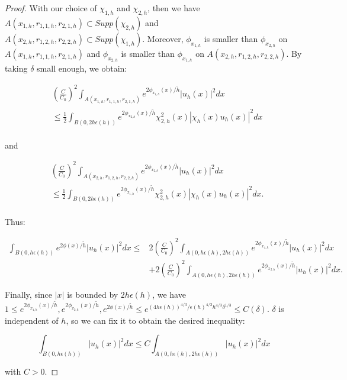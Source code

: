 \documentclass[leqno,11pt,letterpaper, english]{amsart}
\newcommand{\nn}{\nonumber}
\theoremstyle{plain}
\theoremstyle{definition}
\numberwithin{equation}{section}
\begin{document}
\begin{proof}
	With our choice of $\chi_{1,h}$ and $\chi_{2,h}$, then we have $A(x_{1,h},r_{1,1,h},r_{2,1,h})\subset Supp(\chi_{2,h})$ and\\
	$A(x_{2,h},r_{1,2,h},r_{2,2,h})\subset Supp(\chi_{1,h})$. Moreover, $\phi_{x_{1,h}}$ is smaller than $\phi_{x_{2,h}}$ on $A(x_{1,h},r_{1,1,h},r_{2,1,h})$ and $\phi_{x_{2,h}}$ is smaller than $\phi_{x_{1,h}}$ on $A(x_{2,h},r_{1,2,h},r_{2,2,h})$. By taking $\delta$ small enough, we obtain: 
	
	\begin{align}
		&\left(\frac{C}{C_0}\right)^2\int_{ A(x_{1,h},r_{1,1,h},r_{2,1,h})} e^{2\phi_{x_{1,h}}(x)/\tilde{h}}  |u_h(x)|^2 dx   \nn\\
		&\leq \frac{1}{2} \int_{B(0,2h\epsilon(h))} e^{2\phi_{x_{2,h}}(x)/\tilde{h}} \chi_{2,h}^2(x) |\chi_{h}(x) u_h(x)|^2 dx \nn\\
	\end{align}
	
	and
	
	\begin{align}
		&\left(\frac{C}{C_0}\right)^2\int_{ A(x_{2,h},r_{1,2,h},r_{2,2,h})} e^{2\phi_{x_{2,h}}(x)/\tilde{h}}  |u_h(x)|^2 dx   \nn\\
		&\leq \frac{1}{2} \int_{B(0,2h\epsilon(h))} e^{2\phi_{x_{1,h}}(x)/\tilde{h}} \chi_{2,h}^2(x) |\chi_{h}(x) u_h(x)|^2 dx. \nn\\
	\end{align}
	
	Thus:
	
	\begin{align}
		\int_{B(0,h\epsilon(h))} e^{2\phi(x)/\tilde{h}} |u_h(x)|^2 dx\leq
		& 2\left(\frac{C}{C_0}\right)^2\int_{ A(0,h\epsilon(h),2h\epsilon(h))} e^{2\phi_{x_{1,h}}(x)/\tilde{h}}  |u_h(x)|^2 dx   \nn\\
		& + 2\left(\frac{C}{C_0}\right)^2\int_{ A(0,h\epsilon(h),2h\epsilon(h))} e^{2\phi_{x_{2,h}}(x)/\tilde{h}}  |u_h(x)|^2 dx. 
	\end{align}
	
	Finally, since $|x|$ is bounded by $2h\epsilon(h)$, we have \\
	$1\leq e^{2\phi_{x_{1,h}}(x)/\tilde{h}},e^{2\phi_{x_{2,h}}(x)/\tilde{h}},e^{2\phi(x)/\tilde{h}} 
	\leq e^{(4h\epsilon(h))^{4/3}/\epsilon(h)^{4/3}h^{4/3}\delta^{1/3}} \leq C(\delta)$. $\delta$ is independent of $h$, so we can fix it to obtain the desired inequality: 
	
	\begin{equation}
		\int_{B(0,h\epsilon(h))} | u_h(x)|^2 dx \leq C \int_{ A(0,h\epsilon(h),2h\epsilon(h))}  |u_h(x)|^2 dx   
	\end{equation}
	
	with $C>0$.
	
\end{proof}



\typeout{}

\end{document}
